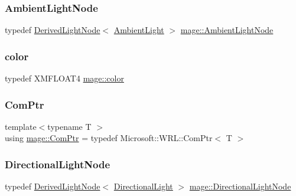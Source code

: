 \subsubsection{\texorpdfstring{Ambient\+Light\+Node}{AmbientLightNode}}
{\footnotesize\ttfamily typedef \hyperlink{classmage_1_1_derived_light_node}{Derived\+Light\+Node}$<$ \hyperlink{classmage_1_1_ambient_light}{Ambient\+Light} $>$ \hyperlink{namespacemage_afdaa06d91a410fa9df6f1822c35d7fa2}{mage\+::\+Ambient\+Light\+Node}}

\hypertarget{namespacemage_a56eceea5a9bceb2b56073f3ea4945781}{}\label{namespacemage_a56eceea5a9bceb2b56073f3ea4945781} 
\subsubsection{\texorpdfstring{color}{color}}
{\footnotesize\ttfamily typedef X\+M\+F\+L\+O\+A\+T4 \hyperlink{namespacemage_a56eceea5a9bceb2b56073f3ea4945781}{mage\+::color}}

\hypertarget{namespacemage_ae74f374780900893caa5555d1031fd79}{}\label{namespacemage_ae74f374780900893caa5555d1031fd79} 
\subsubsection{\texorpdfstring{Com\+Ptr}{ComPtr}}
{\footnotesize\ttfamily template$<$typename T $>$ \\
using \hyperlink{namespacemage_ae74f374780900893caa5555d1031fd79}{mage\+::\+Com\+Ptr} = typedef Microsoft\+::\+W\+R\+L\+::\+Com\+Ptr$<$ T $>$}

\hypertarget{namespacemage_adb6db5310fa7164aed35fc396973c73b}{}\label{namespacemage_adb6db5310fa7164aed35fc396973c73b} 
\subsubsection{\texorpdfstring{Directional\+Light\+Node}{DirectionalLightNode}}
{\footnotesize\ttfamily typedef \hyperlink{classmage_1_1_derived_light_node}{Derived\+Light\+Node}$<$ \hyperlink{classmage_1_1_directional_light}{Directional\+Light} $>$ \hyperlink{namespacemage_adb6db5310fa7164aed35fc396973c73b}{mage\+::\+Directional\+Light\+Node}}

\hypertarget{namespacemage_a536f5856288c280080c9cdf739e85ddc}{}\label{namespacemage_a536f5856288c280080c9cdf739e85ddc} 
